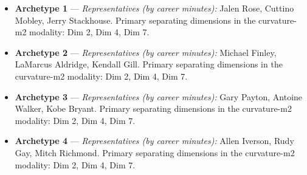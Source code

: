 \begin{itemize}
\item \textbf{Archetype 1} --- \emph{Representatives (by career minutes):} Jalen Rose, Cuttino Mobley, Jerry Stackhouse. Primary separating dimensions in the curvature-m2 modality: Dim 2, Dim 4, Dim 7.
\item \textbf{Archetype 2} --- \emph{Representatives (by career minutes):} Michael Finley, LaMarcus Aldridge, Kendall Gill. Primary separating dimensions in the curvature-m2 modality: Dim 2, Dim 4, Dim 7.
\item \textbf{Archetype 3} --- \emph{Representatives (by career minutes):} Gary Payton, Antoine Walker, Kobe Bryant. Primary separating dimensions in the curvature-m2 modality: Dim 2, Dim 4, Dim 7.
\item \textbf{Archetype 4} --- \emph{Representatives (by career minutes):} Allen Iverson, Rudy Gay, Mitch Richmond. Primary separating dimensions in the curvature-m2 modality: Dim 2, Dim 4, Dim 7.
\end{itemize}
